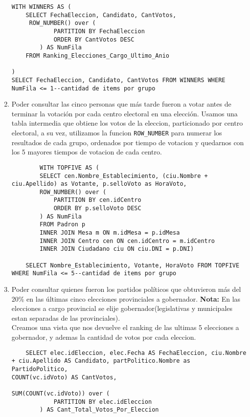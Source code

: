 \begin{enumerate}
\begin{lstlisting}
WITH WINNERS AS (
	SELECT FechaEleccion, Candidato, CantVotos,
	 ROW_NUMBER() over (
	        PARTITION BY FechaEleccion
	        ORDER BY CantVotos DESC
	    ) AS NumFila
	FROM Ranking_Elecciones_Cargo_Ultimo_Anio

)
SELECT FechaEleccion, Candidato, CantVotos FROM WINNERS WHERE NumFila <= 1--cantidad de items por grupo
\end{lstlisting}

	\item Poder consultar las cinco personas que más tarde fueron a votar antes de terminar
	la votación por cada centro electoral en una elección.
	Usamos una tabla intermedia que obtiene los votos de la eleccion, particionado por centro electoral, a su vez, utilizamos la funcion \texttt{ROW\_NUMBER} para numerar los resultados de cada grupo, ordenados por tiempo de votacion y quedarnos con los 5 mayores tiempos de votacion de cada centro.
	\begin{lstlisting}
		WITH TOPFIVE AS (
	    SELECT cen.Nombre_Establecimiento, (ciu.Nombre + ciu.Apellido) as Votante, p.selloVoto as HoraVoto,
	    ROW_NUMBER() over (
	        PARTITION BY cen.idCentro
	        ORDER BY p.selloVoto DESC
	    ) AS NumFila
	    FROM Padron p
	    INNER JOIN Mesa m ON m.idMesa = p.idMesa
	    INNER JOIN Centro cen ON cen.idCentro = m.idCentro
	    INNER JOIN Ciudadano ciu ON ciu.DNI = p.DNI)
	    
	SELECT Nombre_Establecimiento, Votante, HoraVoto FROM TOPFIVE WHERE NumFila <= 5--cantidad de items por grupo
	\end{lstlisting}

	\item Poder consultar quienes fueron los partidos políticos que obtuvieron más del 20\%
	en las últimas cinco elecciones provinciales a gobernador.
	\textbf{Nota:} En las elecciones a cargo provincial se elije gobernador(legislativas y municipales estan separadas de las provinciales).\\

Creamos una vista que nos devuelve el ranking de las ultimas 5 elecciones a gobernador, y ademas la cantidad de votos por cada eleccion.

\begin{lstlisting}
	SELECT elec.idEleccion, elec.Fecha AS FechaEleccion, ciu.Nombre + ciu.Apellido AS Candidato, partPolitico.Nombre as PartidoPolitico, 
COUNT(vc.idVoto) AS CantVotos,  

SUM(COUNT(vc.idVoto)) over (
	        PARTITION BY elec.idEleccion
	    ) AS Cant_Total_Votos_Por_Eleccion  


\end{lstlisting}
\end{enumerate}
